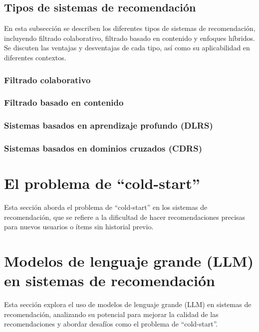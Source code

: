 	\subsection{Tipos de sistemas de recomendación}
	En esta subsección se describen los diferentes tipos de sistemas de recomendación, incluyendo filtrado colaborativo, filtrado basado en contenido y enfoques híbridos. Se discuten las ventajas y desventajas de cada tipo, así como su aplicabilidad en diferentes contextos.

		\subsubsection{Filtrado colaborativo}

		\subsubsection{Filtrado basado en contenido}
		
		\subsubsection{Sistemas basados en aprendizaje profundo (DLRS)}
		
		\subsubsection{Sistemas basados en dominios cruzados (CDRS)}

\section{El problema de \enquote{cold-start}}

	Esta sección aborda el problema de \enquote{cold-start} en los sistemas de recomendación, que se refiere a la dificultad de hacer recomendaciones precisas para nuevos usuarios o ítems sin historial previo.

\section{Modelos de lenguaje grande (LLM) en sistemas de recomendación}

	Esta sección explora el uso de modelos de lenguaje grande (LLM) en sistemas de recomendación, analizando su potencial para mejorar la calidad de las recomendaciones y abordar desafíos como el problema de \enquote{cold-start}.


